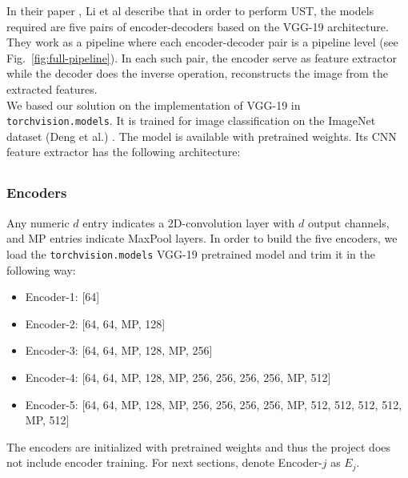 \hspace{0.5cm} In their paper \cite{bib11}, Li et al describe that in order to perform UST, the models required are five pairs of encoder-decoders based on the VGG-19 architecture. They work as a pipeline where each encoder-decoder pair is a pipeline level (see Fig.~\ref{fig:full-pipeline}). In each such pair, the encoder serve as feature extractor while the decoder does the inverse operation, reconstructs the image from the extracted features.\\
We based our solution on the implementation of VGG-19 \cite{bib20} in \texttt{torchvision.models}. It is trained for image classification on the ImageNet dataset (Deng et al.) \cite{bib21}. The model is available with pretrained weights. Its CNN feature extractor has the following architecture: 
\begin{gather*}
[64, 64, MP, 128, 128, MP, 256, 256, 256, 256, MP, 512, 512, 512, 512, MP, 512, 512, 512, 512, MP]
\end{gather*}

\subsubsection{Encoders}
Any numeric $d$ entry indicates a 2D-convolution layer with $d$ output channels, and MP entries indicate MaxPool layers. In order to build the five encoders, we load the \texttt{torchvision.models} VGG-19 pretrained model and trim it in the following way:
\begin{itemize}
	\item Encoder-1: [64]
	\item Encoder-2: [64, 64, MP, 128]
	\item Encoder-3: [64, 64, MP, 128, MP, 256]
	\item Encoder-4: [64, 64, MP, 128, MP, 256, 256, 256, 256, MP, 512]
	\item Encoder-5: [64, 64, MP, 128, MP, 256, 256, 256, 256, MP, 512, 512, 512, 512, MP, 512]
\end{itemize}
The encoders are initialized with pretrained weights and thus the project does not include encoder training. For next sections, denote Encoder-$j$ as $E_j$.

